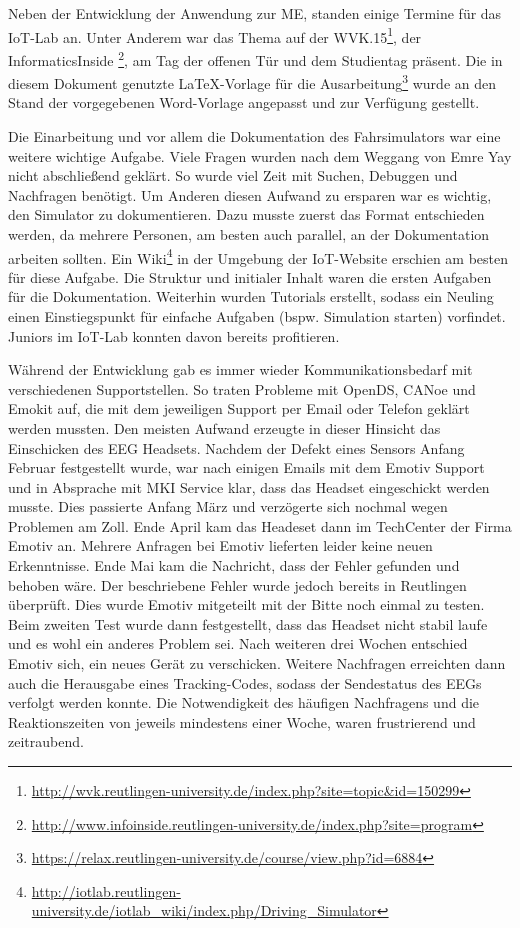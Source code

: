 \label{chap:master_project}
Neben der Entwicklung der Anwendung zur \acl{ME}, standen einige Termine für das IoT-Lab an. Unter Anderem war das Thema auf der WVK.15\footnote{\url{http://wvk.reutlingen-university.de/index.php?site=topic&id=150299}}, der InformaticsInside \footnote{\url{http://www.infoinside.reutlingen-university.de/index.php?site=program}}, am Tag der offenen Tür und dem Studientag präsent. 
Die in diesem Dokument genutzte \LaTeX -Vorlage für die Ausarbeitung\footnote{\url{https://relax.reutlingen-university.de/course/view.php?id=6884}} wurde an den Stand der vorgegebenen Word-Vorlage angepasst und zur Verfügung gestellt.

Die Einarbeitung und vor allem die Dokumentation des Fahrsimulators war eine weitere wichtige Aufgabe. Viele Fragen wurden nach dem Weggang von Emre Yay nicht abschließend geklärt. So wurde viel Zeit mit Suchen, Debuggen und Nachfragen benötigt. Um Anderen diesen Aufwand zu ersparen war es wichtig, den Simulator zu dokumentieren. Dazu musste zuerst das Format entschieden werden, da mehrere Personen, am besten auch parallel, an der Dokumentation arbeiten sollten. Ein Wiki\footnote{\url{http://iotlab.reutlingen-university.de/iotlab_wiki/index.php/Driving_Simulator}} in der Umgebung der IoT-Website erschien am besten für diese Aufgabe. Die Struktur und initialer  Inhalt waren die ersten Aufgaben für die Dokumentation. Weiterhin wurden  Tutorials erstellt, sodass ein Neuling einen Einstiegspunkt für einfache Aufgaben (bspw. Simulation starten) vorfindet. Juniors im IoT-Lab konnten davon bereits profitieren.

Während der Entwicklung gab es immer wieder Kommunikationsbedarf mit verschiedenen Supportstellen. So traten Probleme mit OpenDS, CANoe und Emokit auf, die mit dem jeweiligen Support per Email oder Telefon geklärt werden mussten. Den meisten Aufwand erzeugte in dieser Hinsicht das Einschicken des EEG Headsets. Nachdem der Defekt eines Sensors Anfang Februar festgestellt wurde, war nach einigen Emails mit dem Emotiv Support und in Absprache mit MKI Service klar, dass das Headset eingeschickt werden musste. Dies passierte   Anfang März und verzögerte sich nochmal wegen Problemen am Zoll. Ende April kam das Headeset dann im TechCenter der Firma Emotiv an. Mehrere Anfragen bei Emotiv lieferten leider keine neuen Erkenntnisse. Ende Mai kam die Nachricht, dass der Fehler gefunden und behoben wäre. Der beschriebene Fehler wurde jedoch bereits in Reutlingen überprüft. Dies wurde Emotiv mitgeteilt mit der Bitte noch einmal zu testen. Beim zweiten Test wurde dann festgestellt, dass das Headset nicht stabil laufe und es wohl ein anderes Problem sei. Nach weiteren drei Wochen entschied Emotiv sich, ein neues Gerät zu verschicken. Weitere Nachfragen erreichten dann auch die Herausgabe eines Tracking-Codes, sodass der Sendestatus des EEGs verfolgt werden konnte. Die Notwendigkeit des häufigen Nachfragens und die Reaktionszeiten von jeweils mindestens einer Woche, waren frustrierend und zeitraubend.
